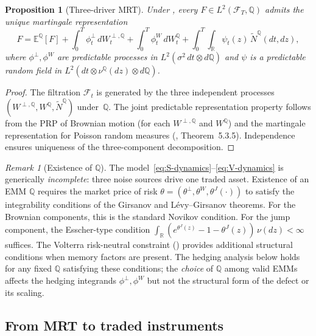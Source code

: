 \documentclass[11pt,a4paper]{article}
\theoremstyle{plain}
\newtheorem{proposition}[theorem]{Proposition}
\theoremstyle{definition}
\theoremstyle{remark}
\newtheorem{remark}[theorem]{Remark}
\newcommand{\E}{\mathbb{E}}
\newcommand{\R}{\mathbb{R}}
\newcommand{\QQ}{\mathbb{Q}}
\newcommand{\F}{\mathcal{F}}
\newcommand{\Ntilde}{\widetilde{N}}
\begin{document}
\begin{proposition}[Three-driver MRT]\label{prop:MRT}
Under , every $F \in L^2(\F_T, \QQ)$ admits
the unique martingale representation
\begin{equation}\label{eq:MRT}
  F = \E^\QQ[F]
  + \int_0^T \phi_t^\perp\,dW_t^{\perp,\QQ}
  + \int_0^T \phi_t^W\,dW_t^\QQ
  + \int_0^T\!\!\int_\R
  \psi_t(z)\,\Ntilde^\QQ(dt,dz),
\end{equation}
where $\phi^\perp, \phi^W$ are predictable processes in
$L^2(\sigma^2\,dt \otimes d\QQ)$ and $\psi$ is a predictable
random field in $L^2(dt \otimes \nu^\QQ(dz) \otimes d\QQ)$.
\end{proposition}

\begin{proof}
The filtration $\F_t$ is generated by the
three independent processes
$(W^{\perp,\QQ}, W^\QQ, \Ntilde^\QQ)$ under~$\QQ$.  The joint
predictable representation property follows from the PRP of
Brownian motion (for each $W^{\perp,\QQ}$ and $W^\QQ$) and the
martingale representation for Poisson random measures
(\cite{Applebaum2009}, Theorem~5.3.5).  Independence ensures
uniqueness of the three-component decomposition.
\end{proof}

\begin{remark}[Existence of $\QQ$]\label{rem:Q-existence}
The model~\eqref{eq:S-dynamics}--\eqref{eq:V-dynamics} is
generically \emph{incomplete}: three noise sources drive
one traded asset.  Existence of an EMM $\QQ$ requires the
market price of risk $\theta = (\theta^\perp, \theta^W,
\theta^J(\cdot))$ to satisfy the integrability conditions
of the Girsanov and L\'evy--Girsanov theorems.  For the
Brownian components, this is the standard Novikov condition.
For the jump component, the Esscher-type condition
$\int_\R(e^{\theta^J(z)} - 1 - \theta^J(z))\,\nu(dz) < \infty$
suffices.  The Volterra risk-neutral constraint
() provides additional structural conditions
when memory factors are present.  The hedging analysis below
holds for any fixed $\QQ$ satisfying these conditions; the
\emph{choice} of $\QQ$ among valid EMMs affects the hedging
integrands $\phi^\perp, \phi^W$ but not the structural form of
the defect or its scaling.
\end{remark}


\subsection{From MRT to traded instruments}
\end{document}
